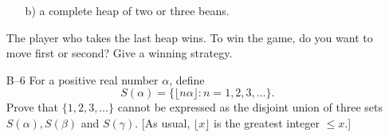 \documentclass[amssymb,twocolumn,pra,10pt,aps]{revtex4-1}
\begin{document}
\begin{itemize}
\begin{itemize}
\item[b)] a complete heap of two or three beans.
\end{itemize}
The player who takes the last heap wins. To win the game, do you
want to move first or second? Give a winning strategy.

\item[B--6] For a positive real number $\alpha$, define
\[
S(\alpha) = \{ \lfloor n\alpha \rfloor : n = 1,2,3,\dots \}.
\]
Prove that $\{1,2,3,\dots\}$ cannot be expressed as the disjoint
union of three sets $S(\alpha), S(\beta)$ and $S(\gamma)$. [As
usual, $\lfloor x \rfloor$ is the greatest integer $\leq x$.]

\end{itemize}
\end{document}
